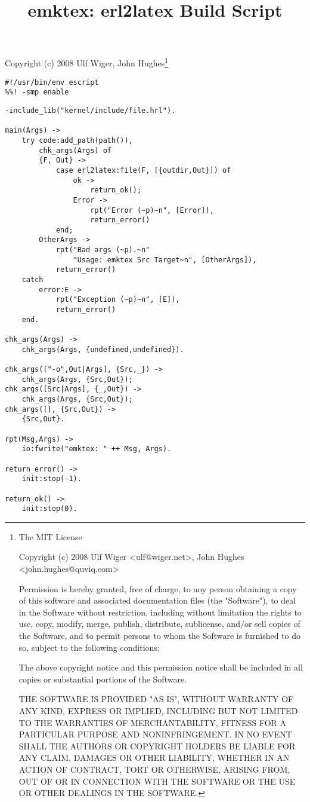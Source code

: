 \documentclass[a4paper,12pt]{article}
\newenvironment{mylisting}
{\begin{list}{}{\setlength{\leftmargin}{1em}}\item\scriptsize\bfseries}
{\end{list}}
\begin{document}
\title{emktex: erl2latex Build Script}
\maketitle
Copyright (c) 2008 Ulf Wiger, John Hughes\footnote{
\tiny{The MIT License

Copyright (c) 2008 Ulf Wiger <ulf@wiger.net>,
John Hughes <john.hughes@quviq.com>

Permission is hereby granted, free of charge, to any person obtaining a
copy of this software and associated documentation files (the "Software"),
to deal in the Software without restriction, including without limitation
the rights to use, copy, modify, merge, publish, distribute, sublicense,
and/or sell copies of the Software, and to permit persons to whom the
Software is furnished to do so, subject to the following conditions:

The above copyright notice and this permission notice shall be included in
all copies or substantial portions of the Software.

THE SOFTWARE IS PROVIDED "AS IS", WITHOUT WARRANTY OF ANY KIND, EXPRESS OR
IMPLIED, INCLUDING BUT NOT LIMITED TO THE WARRANTIES OF MERCHANTABILITY,
FITNESS FOR A PARTICULAR PURPOSE AND NONINFRINGEMENT. IN NO EVENT SHALL
THE AUTHORS OR COPYRIGHT HOLDERS BE LIABLE FOR ANY CLAIM, DAMAGES OR OTHER
LIABILITY, WHETHER IN AN ACTION OF CONTRACT, TORT OR OTHERWISE, ARISING 
FROM, OUT OF OR IN CONNECTION WITH THE SOFTWARE OR THE USE OR OTHER
DEALINGS IN THE SOFTWARE.
}}
\begin{mylisting}
\begin{verbatim}
#!/usr/bin/env escript
%%! -smp enable
\end{verbatim}
\end{mylisting}

\begin{mylisting}
\begin{verbatim}
-include_lib("kernel/include/file.hrl").

main(Args) ->
    try code:add_path(path()),
        chk_args(Args) of
        {F, Out} ->
            case erl2latex:file(F, [{outdir,Out}]) of
                ok ->
                    return_ok();
                Error ->
                    rpt("Error (~p)~n", [Error]),
                    return_error()
            end;
        OtherArgs ->
            rpt("Bad args (~p).~n"
                "Usage: emktex Src Target~n", [OtherArgs]),
            return_error()
    catch
        error:E ->
            rpt("Exception (~p)~n", [E]),
            return_error()
    end.

chk_args(Args) ->
    chk_args(Args, {undefined,undefined}).

chk_args(["-o",Out|Args], {Src,_}) ->
    chk_args(Args, {Src,Out});
chk_args([Src|Args], {_,Out}) ->
    chk_args(Args, {Src,Out});
chk_args([], {Src,Out}) ->
    {Src,Out}.

rpt(Msg,Args) ->
    io:fwrite("emktex: " ++ Msg, Args).

return_error() ->
    init:stop(-1).

return_ok() ->
    init:stop(0).
\end{verbatim}
\end{mylisting}
\end{document}
